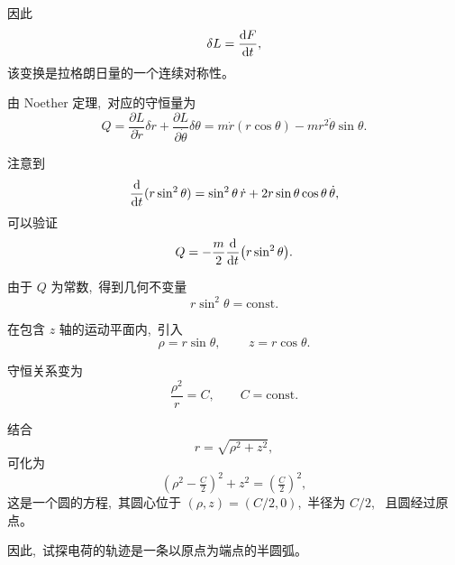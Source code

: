 因此
\[
\delta L = \frac{\dif F}{\dif t},
\]
该变换是拉格朗日量的一个连续对称性。


由 Noether 定理, \,对应的守恒量为
\[
Q
=
\frac{\partial L}{\partial \dot r}\delta r
+
\frac{\partial L}{\partial \dot\theta}\delta\theta
=
m\dot r(r\cos\theta)
-
mr^2\dot\theta\sin\theta.
\]

注意到
\[
\frac{\dif}{\dif t}(r\sin^2\theta)
=
\sin^2\theta\,\dot r
+
2r\sin\theta\cos\theta\,\dot\theta,
\]
可以验证
\[
Q
=
-\frac{m}{2}
\frac{\dif}{\dif t}\bigl(r\sin^2\theta\bigr).
\]

由于 $Q$ 为常数, \,得到几何不变量
\begin{equation}
{
r\sin^2\theta = \text{const}.
}
\end{equation}


在包含 $z$ 轴的运动平面内, \,引入
\[
\rho = r\sin\theta, \,\qquad z=r\cos\theta .
\]

守恒关系变为
\[
\frac{\rho^2}{r} = C,
\qquad C=\text{const}.
\]

结合
\[
r=\sqrt{\rho^2+z^2},
\]
可化为
\[
(\rho^2-\tfrac{C}{2})^2+z^2=(\tfrac{C}{2})^2,
\]
这是一个圆的方程, \,其圆心位于 $(\rho,z)=(C/2,0)$, \,半径为 $C/2$, \,
且圆经过原点。

因此, \,试探电荷的轨迹是一条以原点为端点的半圆弧。
\newpage
